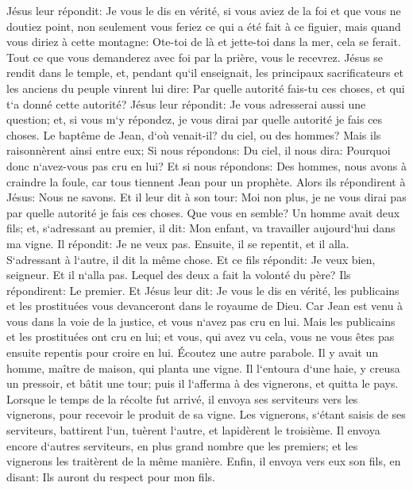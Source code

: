 \verse Jésus leur répondit: Je vous le dis en vérité, si vous aviez de la foi et que vous ne doutiez point, non seulement vous feriez ce qui a été fait à ce figuier, mais quand vous diriez à cette montagne: Ote-toi de là et jette-toi dans la mer, cela se ferait. 
\verse Tout ce que vous demanderez avec foi par la prière, vous le recevrez. 
\verse Jésus se rendit dans le temple, et, pendant qu`il enseignait, les principaux sacrificateurs et les anciens du peuple vinrent lui dire: Par quelle autorité fais-tu ces choses, et qui t`a donné cette autorité? 
\verse Jésus leur répondit: Je vous adresserai aussi une question; et, si vous m`y répondez, je vous dirai par quelle autorité je fais ces choses. 
\verse Le baptême de Jean, d`où venait-il? du ciel, ou des hommes? Mais ils raisonnèrent ainsi entre eux; Si nous répondons: Du ciel, il nous dira: Pourquoi donc n`avez-vous pas cru en lui? 
\verse Et si nous répondons: Des hommes, nous avons à craindre la foule, car tous tiennent Jean pour un prophète. 
\verse Alors ils répondirent à Jésus: Nous ne savons. Et il leur dit à son tour: Moi non plus, je ne vous dirai pas par quelle autorité je fais ces choses. 
\verse Que vous en semble? Un homme avait deux fils; et, s`adressant au premier, il dit: Mon enfant, va travailler aujourd`hui dans ma vigne. 
\verse Il répondit: Je ne veux pas. Ensuite, il se repentit, et il alla. 
\verse S`adressant à l`autre, il dit la même chose. Et ce fils répondit: Je veux bien, seigneur. Et il n`alla pas. 
\verse Lequel des deux a fait la volonté du père? Ils répondirent: Le premier. Et Jésus leur dit: Je vous le dis en vérité, les publicains et les prostituées vous devanceront dans le royaume de Dieu. 
\verse Car Jean est venu à vous dans la voie de la justice, et vous n`avez pas cru en lui. Mais les publicains et les prostituées ont cru en lui; et vous, qui avez vu cela, vous ne vous êtes pas ensuite repentis pour croire en lui. 
\verse Écoutez une autre parabole. Il y avait un homme, maître de maison, qui planta une vigne. Il l`entoura d`une haie, y creusa un pressoir, et bâtit une tour; puis il l`afferma à des vignerons, et quitta le pays. 
\verse Lorsque le temps de la récolte fut arrivé, il envoya ses serviteurs vers les vignerons, pour recevoir le produit de sa vigne. 
\verse Les vignerons, s`étant saisis de ses serviteurs, battirent l`un, tuèrent l`autre, et lapidèrent le troisième. 
\verse Il envoya encore d`autres serviteurs, en plus grand nombre que les premiers; et les vignerons les traitèrent de la même manière. 
\verse Enfin, il envoya vers eux son fils, en disant: Ils auront du respect pour mon fils. 
